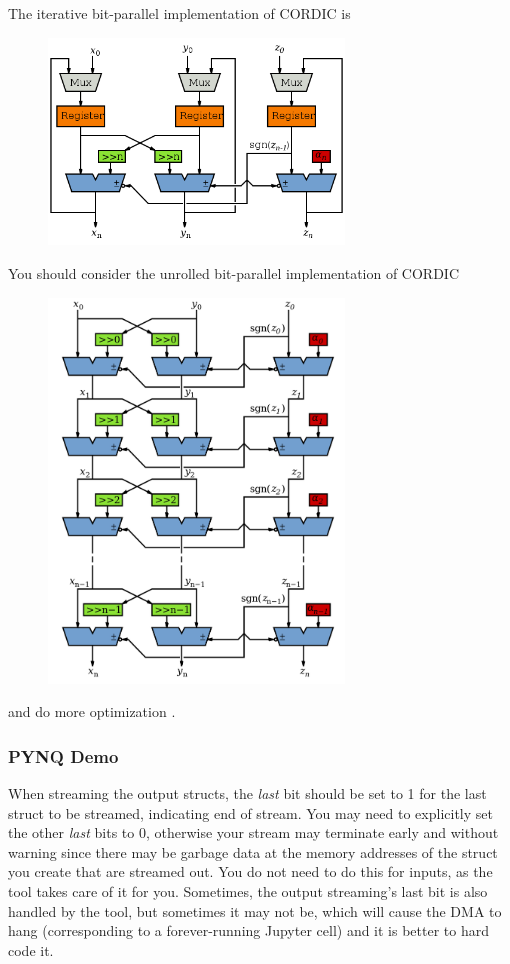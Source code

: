 \documentclass[a4paper,12pt,twoside]{article}
\begin{document}
The iterative bit-parallel implementation of CORDIC is
\begin{figure}[H]
    \centering
    \includegraphics[width=0.7\textwidth]{images/5.png}
\end{figure}
You should consider the unrolled bit-parallel implementation of CORDIC
\begin{figure}[H]
    \centering
    \includegraphics[width=0.7\textwidth]{images/6.png}
\end{figure}
and do more optimization \cite{wikicordic}.
\subsubsection{PYNQ Demo}
When streaming the output structs, the \textit{last} bit should be set to 1 for the last struct to be streamed, indicating end of stream. You may need to explicitly set the other \textit{last} bits to 0, otherwise your stream may terminate early and without warning since there may be garbage data at the memory addresses of the struct you create that are streamed out. You do not need to do this for inputs, as the tool takes care of it for you. Sometimes, the output streaming’s last bit is also handled by the tool, but sometimes it may not be, which will cause the DMA to hang (corresponding to a forever-running Jupyter cell) and it is better to hard code it.
\end{document}
